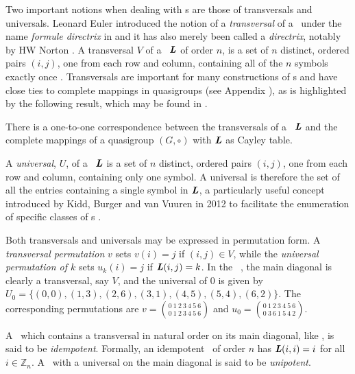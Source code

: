 Two important notions when dealing with \lat s are those of transversals and universals.
Leonard Euler introduced the notion of a \emph{transversal} of a \lat \ under the name \emph{formule directrix} in \cite{Euler1} and it has also merely been called  a \emph{directrix}, notably by HW Norton \cite{Norton1}.  A transversal $V$ of a \lat \ $\mbox{\bf \emph{L}}$ of order $n$, is a set of $n$ distinct, ordered pairs $(i,j)$, one from each row and column, containing all of the $n$ symbols exactly once \cite[Definition 1.27]{colb}. Transversals  are important for many constructions of \lat s and have close ties to complete mappings in quasigroups (see Appendix ), as is highlighted by the following result, which may be found in \cite[Definition 6.5]{colb}.
\begin{theorem}
There is a one-to-one correspondence between the transversals of a \lat \ $\mbox{\bf \emph{L}}$ and the complete mappings of a quasigroup $(G, \circ)$ with $\mbox{\bf \emph{L}}$ as Cayley table.
\end{theorem}
 A \emph{universal}, $U$, of a \lat \ $\mbox{\bf \emph{L}}$ is a set of $n$ distinct, ordered pairs $(i,j)$, one from each row and column, containing only one symbol.  A universal is therefore the set of all the entries containing a single symbol in $\mbox{\bf \emph{L}}$, a particularly useful concept introduced by Kidd, Burger and van Vuuren in 2012 to facilitate the enumeration of specific classes of \lat s \cite{Kidd2012}.

Both transversals and universals may be expressed in permutation form. A \emph{transversal permutation} $v$ sets $v(i) = j$ if $(i,j) \in V$, while the \emph{universal permutation of $k$} sets $u_k(i) = j $ if $\mbox{\bf \emph{L}}(i,j) = k$. In the \lat \  , the main diagonal is clearly a transversal, say $V$, and the universal of $0$ is given by $U_0 = \{(0,0), (1,3), (2,6), (3,1), (4,5), (5,4), (6,2) \}$.  The corresponding permutations are $v= \binom{0 \ 1 \  2\  3\  4\  5\  6}{ 0\ 1\   2\  3\  4\  5\  6 }$  and  $u_0 =\binom{0\ 1\   2\  3\  4\  5\  6}{0\ 3\ 6\ 1\ 5\ 4\ 2 }$.


A \lat \ which contains a transversal in natural order on its main diagonal, like  , is said to be \emph{idempotent}. Formally, an idempotent \lat \  of order $n$ has $\mbox{\bf \emph{L}}(i,i) = i$ for all $i\in \mathbb{Z}_n$. A \lat \ with a universal on the main diagonal is said to be \emph{unipotent}. 
